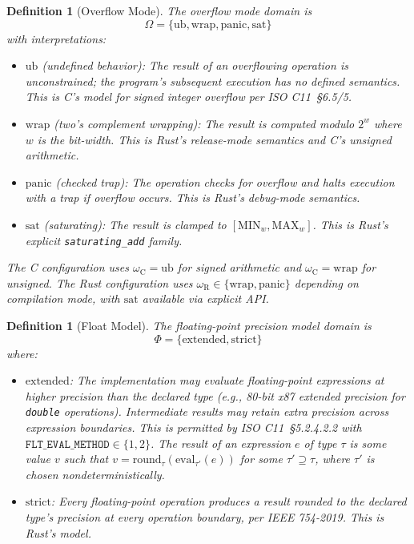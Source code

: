 \documentclass[11pt]{article}
\newtheorem{definition}[theorem]{Definition}
\begin{document}
\begin{definition}[Overflow Mode]
\label{def:overflow}
The overflow mode domain is
\[
  \Omega = \{ \mathrm{ub}, \mathrm{wrap}, \mathrm{panic}, \mathrm{sat} \}
\]
with interpretations:
\begin{itemize}[leftmargin=*]
  \item $\mathrm{ub}$ (undefined behavior): The result of an overflowing operation is unconstrained; the program's subsequent execution has no defined semantics. This is C's model for signed integer overflow per ISO C11~\S6.5/5.
  \item $\mathrm{wrap}$ (two's complement wrapping): The result is computed modulo $2^w$ where $w$ is the bit-width. This is Rust's release-mode semantics and C's unsigned arithmetic.
  \item $\mathrm{panic}$ (checked trap): The operation checks for overflow and halts execution with a trap if overflow occurs. This is Rust's debug-mode semantics.
  \item $\mathrm{sat}$ (saturating): The result is clamped to $[\mathrm{MIN}_w, \mathrm{MAX}_w]$. This is Rust's explicit \texttt{saturating\_add} family.
\end{itemize}
The C configuration uses $\omega_{\mathrm{C}} = \mathrm{ub}$ for signed arithmetic and $\omega_{\mathrm{C}} = \mathrm{wrap}$ for unsigned. The Rust configuration uses $\omega_{\mathrm{R}} \in \{\mathrm{wrap}, \mathrm{panic}\}$ depending on compilation mode, with $\mathrm{sat}$ available via explicit API.
\end{definition}

\begin{definition}[Float Model]
\label{def:floatmodel}
The floating-point precision model domain is
\[
  \Phi = \{ \mathrm{extended}, \mathrm{strict} \}
\]
where:
\begin{itemize}[leftmargin=*]
  \item $\mathrm{extended}$: The implementation may evaluate floating-point expressions at higher precision than the declared type (e.g., 80-bit x87 extended precision for \texttt{double} operations). Intermediate results may retain extra precision across expression boundaries. This is permitted by ISO C11~\S5.2.4.2.2 with $\texttt{FLT\_EVAL\_METHOD} \in \{1, 2\}$. The result of an expression $e$ of type $\tau$ is some value $v$ such that $v = \mathrm{round}_\tau(\mathrm{eval}_{\tau'}(e))$ for some $\tau' \supseteq \tau$, where $\tau'$ is chosen nondeterministically.
  \item $\mathrm{strict}$: Every floating-point operation produces a result rounded to the declared type's precision at every operation boundary, per IEEE 754-2019. This is Rust's model.
\end{itemize}
\end{definition}
\end{document}

